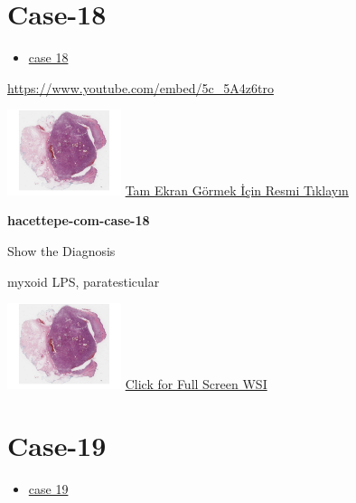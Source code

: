 \documentclass[
  letterpaper,
  paper=6in:9in,
  pagesize=pdftex,
  headinclude=on,
  footinclude=on,
  12pt]{scrbook}
\providecommand{\tightlist}{%
  \setlength{\itemsep}{0pt}\setlength{\parskip}{0pt}}\usepackage{longtable,booktabs,array}
\begin{document}
\hypertarget{sec-hacettepe-case-of-the-month-case-18}{%
\section{Case-18}\label{sec-hacettepe-case-of-the-month-case-18}}

\begin{itemize}
\tightlist
\item
  \href{https://www.youtube.com/watch?v=5c_5A4z6tro\&ab_channel=KemalKosemehmetoglu}{case
  18}
\end{itemize}

\url{https://www.youtube.com/embed/5c_5A4z6tro}

\href{https://images.patolojiatlasi.com/hacettepe-com-case-1/HE.html}{\includegraphics[width=0.25\textwidth,height=\textheight]{./screenshots/hacettepe-com-case-1_screenshot.png}}
\href{https://images.patolojiatlasi.com/hacettepe-com-case-18/HE.html}{Tam
Ekran Görmek İçin Resmi Tıklayın}

\textbf{hacettepe-com-case-18}

Show the Diagnosis

\hypertarget{answer18}{}
myxoid LPS, paratesticular

\href{https://images.patolojiatlasi.com/hacettepe-com-case-1/HE.html}{\includegraphics[width=0.25\textwidth,height=\textheight]{./screenshots/hacettepe-com-case-1_screenshot.png}}
\href{https://images.patolojiatlasi.com/hacettepe-com-case-18/HE.html}{Click
for Full Screen WSI}

\hypertarget{sec-hacettepe-case-of-the-month-case-19}{%
\section{Case-19}\label{sec-hacettepe-case-of-the-month-case-19}}

\begin{itemize}
\tightlist
\item
  \href{https://www.youtube.com/watch?v=SaNDCvKzQ6M\&ab_channel=KemalKosemehmetoglu}{case
  19}
\end{itemize}
\end{document}
